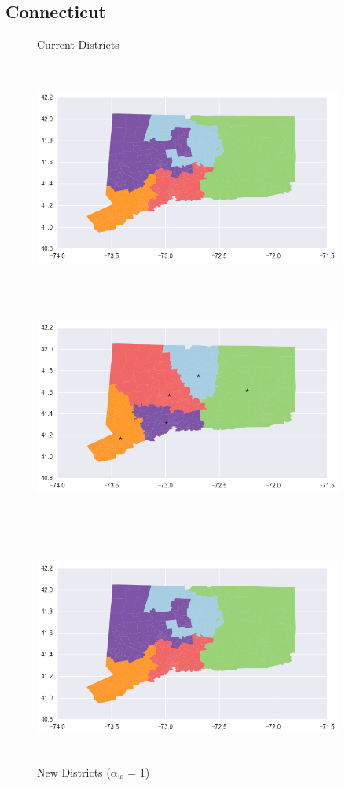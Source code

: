 \clearpage
\newpage

\subsection{Connecticut}
\begin{figure}[htb!] \centering
\caption{ Current Districts }
\includegraphics[width=4in,height=3in,keepaspectratio]{../maps/CT/static/before.png}
\includegraphics[width=4in,height=3in,keepaspectratio]{../maps/CT/static/0_0_after.png}
\caption{ New Districts ($\alpha_w$ = 1) }
\includegraphics[width=4in,height=3in,keepaspectratio]{../maps/CT/static/before.png}

\end{figure}
